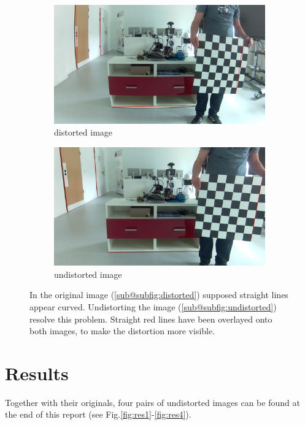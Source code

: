 \documentclass[bibliography=totoc]{scrartcl}
\begin{document}
\begin{figure}[H]
	\centering
	\begin{subfigure}[t]{0.47\linewidth}
		\includegraphics[width=\linewidth]{imgs/distorted.png}
		\caption{distorted image}
		\label{subfig:distorted}
	\end{subfigure}
	\hspace{0.01\textwidth}
	\begin{subfigure}[t]{0.47\linewidth}
		\includegraphics[width=\linewidth]{imgs/undistorted.png}
		\caption{undistorted image}
		\label{subfig:undistorted}
	\end{subfigure}
    \caption{In the original image (\ref{sub@subfig:distorted}) supposed straight lines appear curved. Undistorting the image (\ref{sub@subfig:undistorted}) resolve this problem. Straight red lines have been overlayed onto both images, to make the distortion more visible.}
	\label{fig:comparison}
\end{figure}

\section{Results}
Together with their originals, four pairs of undistorted images can be found at the end of this report (see Fig.\ref{fig:res1}-\ref{fig:res4}).
\end{document}
